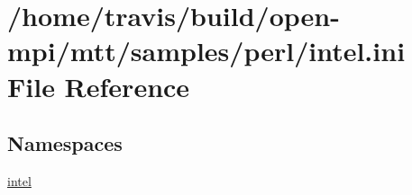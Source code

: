 \hypertarget{intel_8ini}{\section{/home/travis/build/open-\/mpi/mtt/samples/perl/intel.ini File Reference}
\label{intel_8ini}
}
\subsection*{Namespaces}
\begin{DoxyCompactItemize}
\item 
\hyperlink{namespaceintel}{intel}
\end{DoxyCompactItemize}
